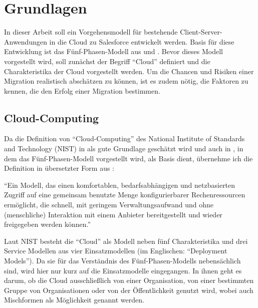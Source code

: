\section{Grundlagen}







In dieser Arbeit soll ein Vorgehensmodell für bestehende 
Client-Server-Anwendungen in die Cloud zu 
Salesforce entwickelt werden. Basis für diese Entwicklung ist das 
Fünf-Phasen-Modell aus  und 
. Bevor dieses Modell vorgestellt 
wird, soll zunächst der Begriff "`Cloud"' definiert und die Charakteristika 
der Cloud vorgestellt werden. Um die Chancen und Risiken einer Migration 
realistisch abschätzen 
zu können, ist es zudem nötig, die Faktoren zu kennen, die den Erfolg einer 
Migration bestimmen. 
\subsection{Cloud-Computing}
Da die Definition von "`Cloud-Computing"' des National Institute of Standards 
and Technology (NIST)  in  als gute 
Grundlage geschätzt wird und auch in , in dem das 
Fünf-Phasen-Modell vorgestellt wird, als Basis dient, übernehme ich die
Definition in übersetzter Form aus :
\begin{cloudcomputing}
"`Ein Modell, das einen komfortablen, bedarfsabhängigen und netzbasierten 
Zugriff auf eine gemeinsam benutzte Menge konfigurierbarer Rechenressourcen 
ermöglicht, die schnell, mit geringem Verwaltungsaufwand und ohne (menschliche) 
Interaktion mit einem Anbieter bereitgestellt und wieder freigegeben werden 
können."'
\end{cloudcomputing}
Laut NIST besteht die "`Cloud"' als Modell neben fünf Charakteristika und drei 
Service Modellen aus vier Einsatzmodellen (im Englischen: "`Deployment 
Models"'). Da sie für das Verständnis des Fünf-Phasen-Modells nebensächlich 
sind, wird hier nur kurz auf die Einsatzmodelle eingegangen. In ihnen geht es 
darum, ob die Cloud ausschließlich von einer Organisation, von einer bestimmten 
Gruppe von Organisationen oder von der Öffentlichkeit genutzt wird, wobei auch 
Mischformen als Möglichkeit genannt werden. 

